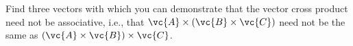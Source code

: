 Find three vectors with which you can demonstrate that the
vector cross product need not be associative, i.e., that
$\vc{A}\times(\vc{B}\times\vc{C})$ need not be the same as 
$(\vc{A}\times\vc{B})\times\vc{C}$.
